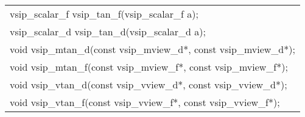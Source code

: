 \\\cvsiplh
\afh
\\\hspace*{.04\textwidth} {
\ttfamily
\begin{tabular}[H]{l}
vsip\_scalar\_f vsip\_tan\_f(vsip\_scalar\_f a);\\
vsip\_scalar\_d vsip\_tan\_d(vsip\_scalar\_d a);\\
void vsip\_mtan\_d(const vsip\_mview\_d*, const vsip\_mview\_d*);\\
void vsip\_mtan\_f(const vsip\_mview\_f*, const vsip\_mview\_f*);\\
void vsip\_vtan\_d(const vsip\_vview\_d*, const vsip\_vview\_d*);\\
void vsip\_vtan\_f(const vsip\_vview\_f*, const vsip\_vview\_f*);\\
\end{tabular}
}
\\\pyjvsiph
{}
